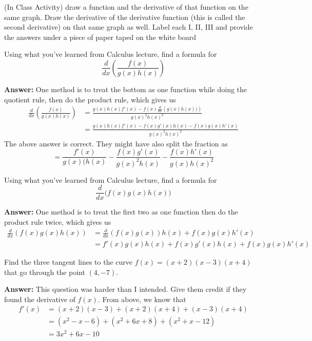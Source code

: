 \documentclass[11pt]{exam}
\begin{document}
	\begin{questions}
		
		\addpoints
		
		\question[0] (In Class Activity) draw a function and the derivative of that function on the same graph.  Draw the derivative of the derivative function (this is called the second derivative) on that same graph as well.  Label each I, II, III and provide the answers under a piece of paper taped on the white board
		
		\question[5] Using what you've learned from Calculus lecture, find a formula for
		\[
		\frac{d}{d x} \left( \frac{f(x)}{g(x)h(x)} \right)
		\]
		
		\textbf{Answer:} One method is to treat the bottom as one function while doing the quotient rule, then do the product rule, which gives us
		\[
		\begin{aligned}
		\frac{d}{dx} \left( \frac{f(x)}{g(x)h(x)} \right) &= \frac{g(x)h(x)f'(x) - f(x) \frac{d}{dx} \left(g(x)h(x))\right)}{g(x)^2h(x)^2}\\
		&= \frac{g(x)h(x)f'(x) - f(x) g'(x)h(x) - f(x)g(x)h'(x)}{g(x)^2h(x)^2}
		\end{aligned}
		\]
		The above answer is correct.  They might have also split the fraction as
		\[
		= \frac{f'(x)}{g(x)(h(x)} - \frac{f(x)g'(x)}{g(x)^2h(x)} - \frac{f(x)h'(x)}{g(x)h(x)^2}
		\]
		
			\question[5] Using what you've learned from Calculus lecture, find a formula for
		\[
		\frac{d}{d x} \Big( f(x)g(x)h(x) \Big)
		\]
		
		\textbf{Answer:} One method is to treat the first two as one function then do the product rule twice, which gives us
		\[
		\begin{aligned}
		\frac{d}{dx} \left( f(x)g(x)h(x) \right) &= \frac{d}{dx}\left(f(x)g(x)\right) h(x) + f(x)g(x)h'(x)\\
		&= f'(x)g(x)h(x) + f(x)g'(x)h(x) + f(x)g(x)h'(x)
		\end{aligned}
		\]
		
		\question[5] Find the three tangent lines to the curve $f(x)=(x+2)(x-3)(x+4)$ that go through the point $(4,-7)$.
		
		\newpage
		
		\textbf{Answer:} This question was harder than I intended.  Give them credit if they found the derivative of $f(x)$.  From above, we know that
		\[
		\begin{aligned}
		f'(x) &= (x+2)(x-3) + (x+2)(x+4) + (x-3)(x+4)\\
		&= (x^2 - x - 6) + (x^2 + 6x + 8) + (x^2 + x - 12)\\
		&= 3x^2 + 6x - 10
		\end{aligned}
		\]
		

\end{questions}
\end{document}

